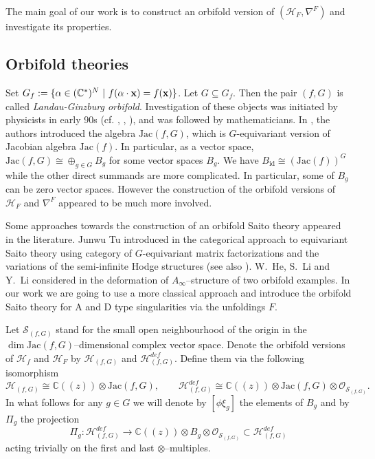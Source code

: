 \documentclass[reqno,12pt]{amsart}
\numberwithin{equation}{section}
\theoremstyle{plain}
\theoremstyle{definition}
\newcommand{\CC}{{\mathbb{C}}}
\newcommand{\Jac}{\mathrm{Jac}}
\newcommand{\id}{\mathrm{id}}
\newcommand{\bx}{{\bf x}}
\def\H{{\mathcal H}}
\def\O{{\mathcal O}}
\numberwithin{equation}{section}
\begin{document}
The main goal of our work is to construct an orbifold version of $(\H_F, \nabla^F)$ and investigate its properties.

\subsection*{Orbifold theories} Set $G_f := \lbrace \alpha \in (\CC^\ast)^N \ | \ f(\alpha \cdot \bx) = f(\bx) \rbrace$. Let $G \subseteq G_f$.
Then the pair $(f,G)$ is called \emph{Landau-Ginzburg orbifold}. Investigation of these objects was initiated by physicists in early 90s (cf. \cite{IV}, \cite{V}, \cite{Witt}), and was followed by mathematicians. In \cite{BTW1}, \cite{BT1} the authors introduced the algebra $\Jac(f,G)$, which is $G$-equivariant version of Jacobian algebra $\Jac(f)$. In particular, as a vector space, $\Jac(f,G) \cong \oplus_{g \in G} B_g$ for some vector spaces $B_g$. We have $B_\id \cong (\Jac(f))^G$ while the other direct summands are more complicated. In particular, some of $B_g$ can be zero vector spaces.
However the construction of the orbifold versions of $\H_F$ and $\nabla^F$ appeared to be much more involved.

Some approaches towards the construction of an orbifold Saito theory appeared in the literature. Junwu Tu introduced in \cite{Tu21a,Tu21b} the categorical approach to equivariant Saito theory using category of $G$-equivariant matrix factorizations and the variations of the semi-infinite Hodge structures (see also \cite{AT22}). W.~He, S.~Li and Y.~Li considered in \cite{HLL} the deformation of $A_\infty$--structure of two orbifold examples.
In our work we are going to use a more classical approach and introduce the orbifold Saito theory for A and D type singularities via the unfoldings $F$.

Let $\mathcal{S}_{(f,G)}$ stand for the small open neighbourhood of the origin in the $\dim \Jac(f,G)$--dimensional complex vector space. 
Denote the orbifold versions of $\H_f$ and $\H_F$ by $\H_{(f,G)}$ and $\H^{def}_{(f,G)}$. Define them via the following isomorphism
\[
    \H_{(f,G)} \cong \CC((z)) \otimes \Jac(f,G), \qquad \H^{def}_{(f,G)} \cong \CC((z)) \otimes \Jac(f,G) \otimes \O_{\mathcal{S}_{(f,G)}}.
\]
In what follows for any $g \in G$ we will denote by $[\phi \xi_g]$ the elements of $B_g$ and by $\Pi_g$ the projection
\[
    \Pi_g : \H^{def}_{(f,G)} \to \CC((z)) \otimes B_g \otimes \O_{\mathcal{S}_{(f,G)}} \subset \H^{def}_{(f,G)}
\]
acting trivially on the first and last $\otimes$--multiples.
\end{document}
